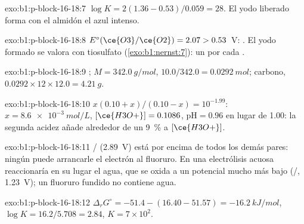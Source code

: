 \begin{solution}{exo:b1:p-block-16-18:7}
$\log K = 2(1.36 - 0.53)/0.059 = 28$. El yodo liberado forma con el
almidón el  azul intenso.
\end{solution}

\begin{solution}{exo:b1:p-block-16-18:8}
$E^\circ(\ce{O3}/\ce{O2}) = 2.07 > 0.53$~V: . El yodo formado se valora con tiosulfato
(\cref{exo:b1:nernst:7}): un  por cada .
\end{solution}

\begin{solution}{exo:b1:p-block-16-18:9}
; $M = \qty{342.0}{g/mol}$, $10.0/342.0 =
\qty{0.0292}{mol}$; carbono, $0.0292 \times 12 \times 12.0 = \qty{4.21}{g}$.
\end{solution}

\begin{solution}{exo:b1:p-block-16-18:10}
$x(0.10 + x)/(0.10 - x) = 10^{-1.99}$: $x = \qty{8.6e-3}{mol/L}$,
$[\ce{H3O+}] = 0.1086$, $\mathrm{pH} = 0.96$ en lugar de 1.00: la segunda
acidez añade alrededor de un \qty{9}{\percent} a $[\ce{H3O+}]$.
\end{solution}

\begin{solution}{exo:b1:p-block-16-18:11}
/ (2.89~V) está por encima de todos los demás pares: ningún
 puede arrancarle el electrón al fluoruro. En una electrólisis
acuosa reaccionaría en su lugar el agua, que se oxida a un potencial
mucho más bajo (/, 1.23~V); un fluoruro fundido no
contiene agua.
\end{solution}

\begin{solution}{exo:b1:p-block-16-18:12}
$\Delta_r G^\circ = -51.4 - (16.40 - 51.57) = \qty{-16.2}{kJ/mol}$,
$\log K = 16.2/5.708 = 2.84$, $K = 7 \times 10^2$.
\end{solution}

